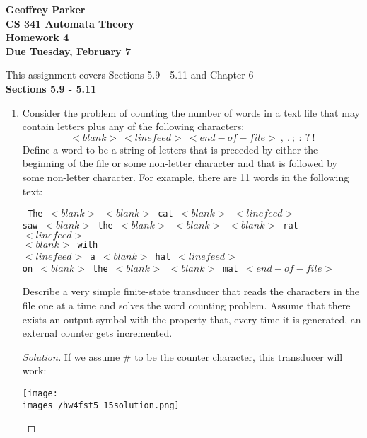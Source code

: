 \documentclass[10pt]{article}
\newcommand{\images}{/home/gparker/classes/341/images}
\begin{document}
\begin{flushleft}
\noindent
\textbf{\noindent
Geoffrey Parker\\
CS 341 Automata Theory \\
Homework 4 \\
Due Tuesday, February 7}\\
\end{flushleft}
\noindent
This assignment covers Sections 5.9 - 5.11 and Chapter 6 \\

\noindent
\textbf{Sections 5.9 - 5.11}
\begin{enumerate}[1)]
\addtocounter{enumi}{14}

\item
Consider the problem of counting the number of words in a text file that may contain letters plus any  of the following characters:
\[<blank>\ <linefeed>\ <end-of-file>\ ,\ .\ ;\ :\ ?\ !\]
Define a word to be a string of letters that is preceded by either the beginning of the file or some non-letter character and that is followed by some non-letter character.  For example, there are 11 words in the following text:
\begin{flushleft}

\parindent 2cm

\texttt{\noindent
\hspace{2cm}The $<blank>$ $<blank>$ cat $<blank>$ $<linefeed>$\\
saw $<blank>$ the $<blank>$ $<blank>$ $<blank>$ rat $<linefeed>$\\
$<blank>$ with\\
$<linefeed>$ a $<blank>$ hat $<linefeed>$\\
on $<blank>$ the $<blank>$ $<blank>$ mat $<end-of-file>$
}
\end{flushleft}
Describe a very simple finite-state transducer that reads the characters in the file one at a time and solves the word counting problem.  Assume that there exists an output symbol with the property that, every time it is generated, an 
external counter gets incremented.

\begin{proof}[Solution]
If we assume $\#$ to be the counter character, this transducer will work:
\begin{center}
\texttt{[image: \\images /hw4fst5\_15solution.png]}
\end{center}
\end{proof}

\pagebreak
\addtocounter{enumi}{1}


\end{enumerate}
\end{document}
